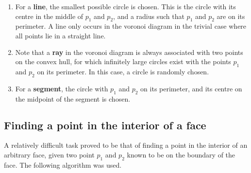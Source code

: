 \documentclass[a4paper,12pt]{article}
\begin{document}
\begin{enumerate}
\item
For a {\bf line}, the smallest possible circle is chosen. This is the circle with its centre in the middle of $p_1$ and $p_2$, and a radius such that $p_1$ and $p_2$ are on its perimeter. A line only occurs in the voronoi diagram in the trivial case where all points lie in a straight line.
\item
Note that a {\bf ray} in the voronoi diagram is always associated with two points on the convex hull, for which infinitely large circles exist with the points $p_1$ and $p_2$ on its perimeter. In this case, a circle is randomly chosen.
\item
For a {\bf segment}, the circle with $p_1$ and $p_2$ on its perimeter, and its centre on the midpoint of the segment is chosen.
\end{enumerate}

\subsection{Finding a point in the interior of a face}
\label{sec:findPoints}
A relatively difficult task proved to be that of finding a point in the interior of an arbitrary face, given two point $p_1$ and $p_2$ known to be on the boundary of the face. The following algorithm was used.
\end{document}

